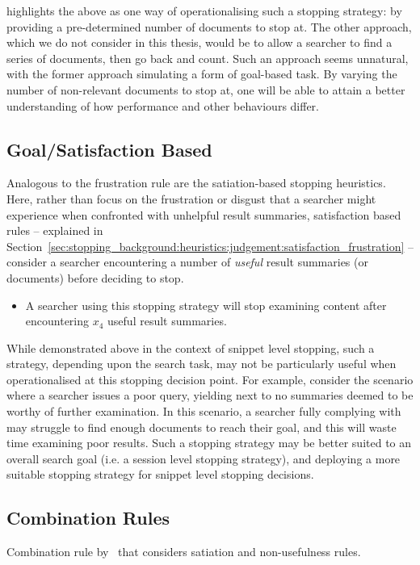 \cite{cooper1973retrieval_effectiveness_ii} highlights the above as one way of operationalising such a stopping strategy: by providing a pre-determined number of documents to stop at. The other approach, which we do not consider in this thesis, would be to allow a searcher to find a series of documents, then go back and count. Such an approach seems unnatural, with the former approach simulating a form of goal-based task. By varying the number of non-relevant documents to stop at, one will be able to attain a better understanding of how performance and other behaviours differ.

\subsection{Goal/Satisfaction Based}
Analogous to the frustration rule are the satiation-based stopping heuristics. Here, rather than focus on the frustration or disgust that a searcher might experience when confronted with unhelpful result summaries, satisfaction based rules -- explained in Section~\ref{sec:stopping_background:heuristics:judgement:satisfaction_frustration} -- consider a searcher encountering a number of \emph{useful} result summaries (or documents) before deciding to stop.

\begin{itemize}
    \item[\blueboxbold{SS4}] A searcher using this stopping strategy will stop examining content after encountering $x_4$ useful result summaries.
\end{itemize}

While demonstrated above in the context of snippet level stopping, such a strategy, depending upon the search task, may not be particularly useful when operationalised at this stopping decision point. For example, consider the scenario where a searcher issues a poor query, yielding next to no summaries deemed to be worthy of further examination. In this scenario, a searcher fully complying with  may struggle to find enough documents to reach their goal, and this will waste time examining poor results. Such a stopping strategy may be better suited to an overall search goal (i.e. a session level stopping strategy), and deploying a more suitable stopping strategy for snippet level stopping decisions.

\subsection{Combination Rules}
Combination rule by~\citealt{kraft1979stopping_rules} that considers satiation and non-usefulness rules.

